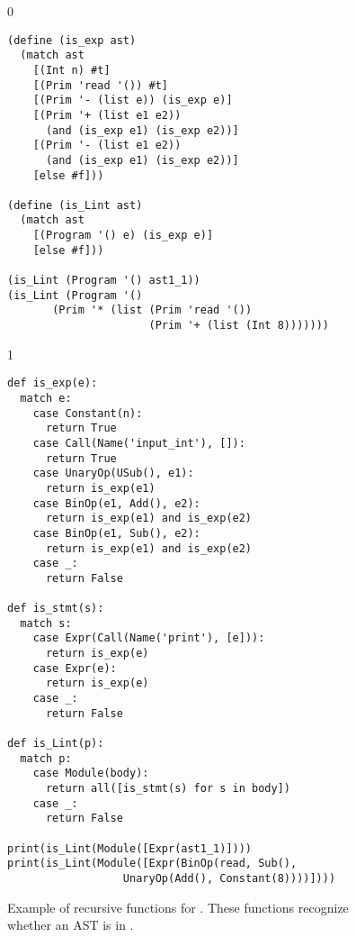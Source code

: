 \documentclass[7x10]{TimesAPriori_MIT}%
\def\racketEd{0}
\def\pythonEd{1}
\def\edition{1}
\newcommand{\pythonColor}[0]{}
\numberwithin{theorem}{chapter}
\numberwithin{definition}{chapter}
\numberwithin{equation}{chapter}
\begin{document}
\begin{figure}[tp]
\begin{tcolorbox}[colback=white]
{\if\edition\racketEd
\begin{lstlisting}
(define (is_exp ast)
  (match ast
    [(Int n) #t]
    [(Prim 'read '()) #t]
    [(Prim '- (list e)) (is_exp e)]
    [(Prim '+ (list e1 e2))
      (and (is_exp e1) (is_exp e2))]
    [(Prim '- (list e1 e2))
      (and (is_exp e1) (is_exp e2))]
    [else #f]))

(define (is_Lint ast)
  (match ast
    [(Program '() e) (is_exp e)]
    [else #f]))

(is_Lint (Program '() ast1_1))
(is_Lint (Program '()
       (Prim '* (list (Prim 'read '())
                      (Prim '+ (list (Int 8)))))))
\end{lstlisting}
\fi}
{\if\edition\pythonEd\pythonColor
\begin{lstlisting}
def is_exp(e):
  match e:
    case Constant(n):
      return True
    case Call(Name('input_int'), []):
      return True
    case UnaryOp(USub(), e1):
      return is_exp(e1)
    case BinOp(e1, Add(), e2):
      return is_exp(e1) and is_exp(e2)
    case BinOp(e1, Sub(), e2):
      return is_exp(e1) and is_exp(e2)
    case _:
      return False

def is_stmt(s):
  match s:
    case Expr(Call(Name('print'), [e])):
      return is_exp(e)
    case Expr(e):
      return is_exp(e)
    case _:
      return False
  
def is_Lint(p):
  match p:
    case Module(body):
      return all([is_stmt(s) for s in body])
    case _:
      return False

print(is_Lint(Module([Expr(ast1_1)])))
print(is_Lint(Module([Expr(BinOp(read, Sub(),
                  UnaryOp(Add(), Constant(8))))])))
\end{lstlisting}
\fi}
\end{tcolorbox}
\caption{Example of recursive functions for \LangInt{}. These functions
  recognize whether an AST is in \LangInt{}.}
\label{fig:exp-predicate}
\end{figure}


\end{document}

